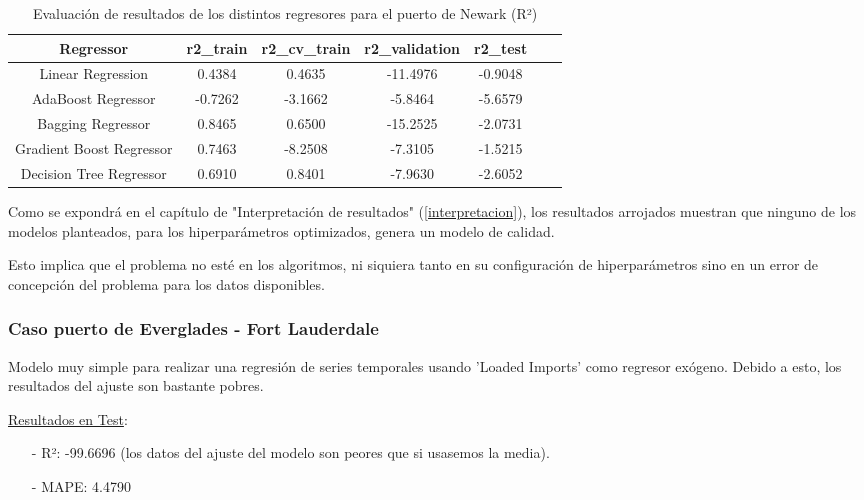 \documentclass[12pt]{article}
\begin{document}
	\begingroup
	\begin{table}[H]
		\caption{\label{tabla_r2_newark}Evaluación de resultados de los distintos regresores para el puerto de Newark (R²)}
		\centering
		\setlength{\tabcolsep}{3pt}
		\renewcommand{\arraystretch}{1.5}
		\begin{tabular}{|c|c|c|c|c|c|c|}
			\hline
			Regressor & r2\_train & r2\_cv\_train & r2\_validation & r2\_test \\
			\hline
			Linear Regression & 0.4384 & 0.4635 & -11.4976 & -0.9048 \\
			AdaBoost Regressor & -0.7262 & -3.1662 & -5.8464 & -5.6579 \\
			Bagging Regressor & 0.8465 & 0.6500 & -15.2525 & -2.0731 \\
			Gradient Boost Regressor & 0.7463 & -8.2508 & -7.3105 & -1.5215 \\
			Decision Tree Regressor & 0.6910 & 0.8401 & -7.9630 & -2.6052 \\
			\hline
		\end{tabular}
	\end{table}
	\endgroup
	
	Como se expondrá en el capítulo de "Interpretación de resultados" (\ref{interpretacion}), los resultados arrojados muestran que ninguno de los modelos planteados, para los hiperparámetros optimizados, genera un modelo de calidad.

	Esto implica que el problema no esté en los algoritmos, ni siquiera tanto en su configuración de hiperparámetros sino en un error de concepción del problema para los datos disponibles.
	
	\subsubsection{\label{evalFL} Caso puerto de Everglades - Fort Lauderdale}
	Modelo muy simple para realizar una regresión de series temporales usando 'Loaded Imports' como regresor exógeno. Debido a esto, los resultados del ajuste son bastante pobres.
	
	\underline{Resultados en Test}: \\
	\begin{itemize}
		\item[-] R²: -99.6696 (los datos del ajuste del modelo son peores que si usasemos la media).
		\item[-] MAPE: 4.4790
	\end{itemize}
\end{document}
